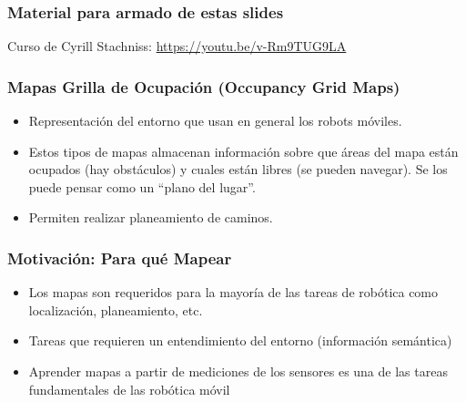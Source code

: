\begin{frame}
	\frametitle{Material para armado de estas slides}
	Curso de Cyrill Stachniss: \url{https://youtu.be/v-Rm9TUG9LA}

\end{frame}

\begin{frame}
    \frametitle{Mapas Grilla de Ocupación (Occupancy Grid Maps)}
    
    \begin{itemize}
    \item Representación del entorno que usan en general los robots móviles.
    \item Estos tipos de mapas almacenan información sobre que áreas del mapa están ocupados (hay obstáculos) y cuales están libres (se pueden navegar). Se los puede pensar como un ``plano del lugar''.
    \item Permiten realizar planeamiento de caminos.
    \end{itemize}
   
\end{frame}

\begin{frame}
    \frametitle{Motivación: Para qué Mapear}
    
    \begin{itemize}
        \item Los mapas son requeridos para la mayoría de las tareas de robótica como localización, planeamiento, etc.
        \item Tareas que requieren un entendimiento del entorno (información semántica)
        \item Aprender mapas a partir de mediciones de los sensores es una de las tareas fundamentales de las robótica móvil
    \end{itemize}
    
\end{frame}

